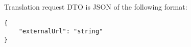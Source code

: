 \documentclass[../main.tex]{subfiles}
\begin{document}
Translation request DTO is JSON of the following format:
\begin{lstlisting}[numbers=none]
{
    "externalUrl": "string"
}
\end{lstlisting}
\end{document}
